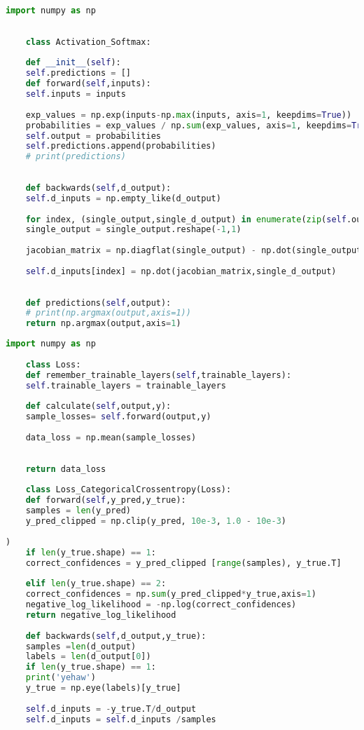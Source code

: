 \begin{lstlisting}[language=Python, caption=Softmax Activation]
	import numpy as np
	
	
	class Activation_Softmax:
	
	def __init__(self):
	self.predictions = []
	def forward(self,inputs):
	self.inputs = inputs
	
	exp_values = np.exp(inputs-np.max(inputs, axis=1, keepdims=True))
	probabilities = exp_values / np.sum(exp_values, axis=1, keepdims=True)
	self.output = probabilities
	self.predictions.append(probabilities)
	# print(predictions)
	
	
	def backwards(self,d_output):
	self.d_inputs = np.empty_like(d_output)
	
	for index, (single_output,single_d_output) in enumerate(zip(self.output,d_output)):
	single_output = single_output.reshape(-1,1)
	
	jacobian_matrix = np.diagflat(single_output) - np.dot(single_output,single_output.T)
	
	self.d_inputs[index] = np.dot(jacobian_matrix,single_d_output)
	
	
	def predictions(self,output):
	# print(np.argmax(output,axis=1))
	return np.argmax(output,axis=1)

\end{lstlisting}

\begin{lstlisting}[language=Python, caption=Loss function]
	import numpy as np
	
	class Loss:
	def remember_trainable_layers(self,trainable_layers):
	self.trainable_layers = trainable_layers
	
	def calculate(self,output,y):
	sample_losses= self.forward(output,y)
	
	data_loss = np.mean(sample_losses)
	
	
	return data_loss
	
	class Loss_CategoricalCrossentropy(Loss):
	def forward(self,y_pred,y_true):
	samples = len(y_pred)
	y_pred_clipped = np.clip(y_pred, 10e-3, 1.0 - 10e-3)
	
)
	if len(y_true.shape) == 1:
	correct_confidences = y_pred_clipped [range(samples), y_true.T]
	
	elif len(y_true.shape) == 2:
	correct_confidences = np.sum(y_pred_clipped*y_true,axis=1)
	negative_log_likelihood = -np.log(correct_confidences)
	return negative_log_likelihood
	
	def backwards(self,d_output,y_true):
	samples =len(d_output)
	labels = len(d_output[0])
	if len(y_true.shape) == 1:
	print('yehaw')
	y_true = np.eye(labels)[y_true]
	
	self.d_inputs = -y_true.T/d_output
	self.d_inputs = self.d_inputs /samples
	

\end{lstlisting}

